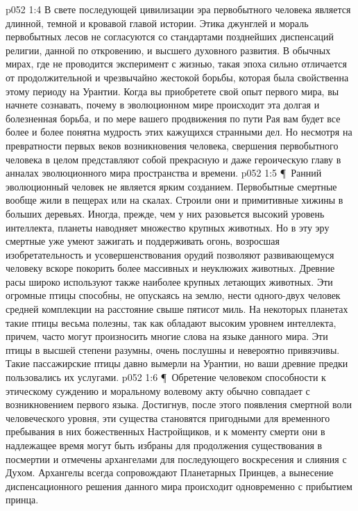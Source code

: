 \vs p052 1:4 В свете последующей цивилизации эра первобытного человека является длинной, темной и кровавой главой истории. Этика джунглей и мораль первобытных лесов не согласуются со стандартами позднейших диспенсаций религии, данной по откровению, и высшего духовного развития. В обычных мирах, где не проводится эксперимент с жизнью, такая эпоха сильно отличается от продолжительной и чрезвычайно жестокой борьбы, которая была свойственна этому периоду на Урантии. Когда вы приобретете свой опыт первого мира, вы начнете сознавать, почему в эволюционном мире происходит эта долгая и болезненная борьба, и по мере вашего продвижения по пути Рая вам будет все более и более понятна мудрость этих кажущихся странными дел. Но несмотря на превратности первых веков возникновения человека, свершения первобытного человека в целом представляют собой прекрасную и даже героическую главу в анналах эволюционного мира пространства и времени.
\vs p052 1:5 \P\ Ранний эволюционный человек не является ярким созданием. Первобытные смертные вообще жили в пещерах или на скалах. Строили они и примитивные хижины в больших деревьях. Иногда, прежде, чем у них разовьется высокий уровень интеллекта, планеты наводняет множество крупных животных. Но в эту эру смертные уже умеют зажигать и поддерживать огонь, возросшая изобретательность и усовершенствования орудий позволяют развивающемуся человеку вскоре покорить более массивных и неуклюжих животных. Древние расы широко используют также наиболее крупных летающих животных. Эти огромные птицы способны, не опускаясь на землю, нести одного\hyp{}двух человек средней комплекции на расстояние свыше пятисот миль. На некоторых планетах такие птицы весьма полезны, так как обладают высоким уровнем интеллекта, причем, часто могут произносить многие слова на языке данного мира. Эти птицы в высшей степени разумны, очень послушны и невероятно привязчивы. Такие пассажирские птицы давно вымерли на Урантии, но ваши древние предки пользовались их услугами.
\vs p052 1:6 \P\ Обретение человеком способности к этическому суждению и моральному волевому акту обычно совпадает с возникновением первого языка. Достигнув, после этого появления смертной воли человеческого уровня, эти существа становятся пригодными для временного пребывания в них божественных Настройщиков, и к моменту смерти они в надлежащее время могут быть избраны для продолжения существования в посмертии и отмечены архангелами для последующего воскресения и слияния с Духом. Архангелы всегда сопровождают Планетарных Принцев, а вынесение диспенсационного решения данного мира происходит одновременно с прибытием принца.
